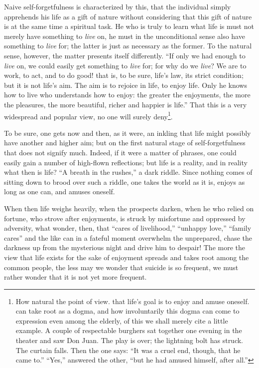 \documentclass[12pt,a4paper,openany]{book}
\newcommand{\opage}[1]{\marginnote{\footnotesize\textit{[#1]}}}
\begin{document}
Naive self-forgetfulness is characterized by this, that the individual simply apprehends his life as a gift of nature without considering that this gift of nature is at the same time a spiritual task. He who is truly to learn what life is must not merely have something to \emph{live} on, he must in the unconditional sense also have something to \emph{live} for; the latter is just as necessary as the former. To the natural sense, however, the matter presents itself differently. ``If only we had enough to \emph{live} on, we could easily get something to \emph{live} for; for why do we \emph{live}? We are to work, to act, and to do good! that is, to be sure, life's law, its strict condition; but it is not life's aim. The aim is to rejoice in life, to enjoy life. Only he knows how to live who understands how to enjoy: the greater the enjoyments, the more the pleasures, the more beautiful, richer and happier is life.'' That this is a
\setcounter{footnote}{0}%
\opage{701}very widespread and popular view, no one will surely deny\footnote[1]{How natural the point of view. that life's goal is to enjoy and amuse oneself. can take root as a dogma, and how involuntarily this dogma can come to expression even among the elderly, of this we shall merely cite a little example. A couple of respectable burghers sat together one evening in the theater and saw Don Juan. The play is over; the lightning bolt has struck. The curtain falls. Then the one says: ``It was a cruel end, though, that he came to.'' ``Yes,'' answered the other, ``but he had amused himself, after all.''}. %

To be sure, one gets now and then, as it were, an inkling that life might possibly have another and higher aim; but on the first natural stage of self-forgetfulness that does not signify much. Indeed, if it were a matter of phrases, one could easily gain a number of high-flown reflections; but life is a reality, and in reality what then is life? ``A breath in the rushes,'' a dark riddle. Since nothing comes of sitting down to brood over such a riddle, one takes the world as it is, enjoys as long as one can, and amuses oneself.

When then life weighs heavily, when the prospects darken, when he who relied on fortune, who strove after enjoyments, is struck by misfortune and oppressed by adversity, what wonder, then, that ``cares of livelihood,'' ``unhappy love,'' ``family cares'' and the like can in a fateful moment overwhelm the unprepared, chase the darkness up from the mysterious night and drive him to despair! The more the view that life exists for the sake of enjoyment spreads and takes root among the common people, the less may we wonder that suicide is so frequent, we must rather wonder that it is not yet more frequent.
\end{document}
